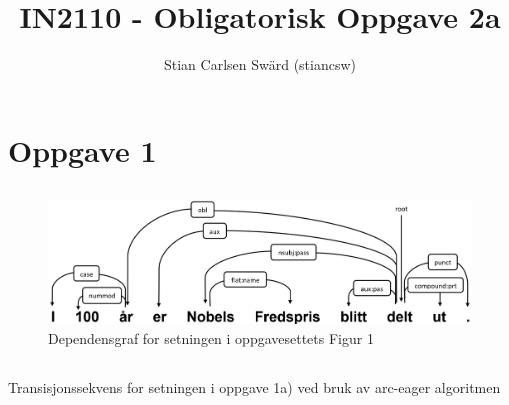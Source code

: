 \documentclass{article}
\title{IN2110 - Obligatorisk Oppgave 2a}
\author{Stian Carlsen Swärd (stiancsw)}
\begin{document}
\maketitle

\section{Oppgave 1}
\subsection{}
\begin{figure}[h]
\includegraphics[scale=0.28]{1a-graph}
\caption{Dependensgraf for setningen i oppgavesettets Figur 1}
\end{figure}
\newpage
\subsection{}
Transisjonssekvens for setningen i oppgave 1a) ved bruk av arc-eager algoritmen\par
\end{document}
